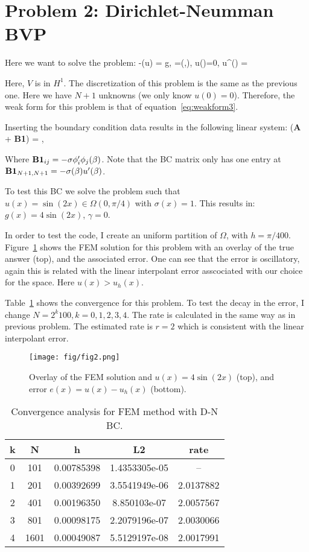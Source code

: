 \documentclass[10pt]{article}
\def\up#1{ #1^{\prime}}
\begin{document}
\section{Problem 2: Dirichlet-Neumman BVP}
Here we want to solve the problem:
\beq
-\nabla\cdot(\sigma\nabla u) = g, \Omega=(\alpha,\beta), u(\alpha)=0, \up{u}(\beta) =\gamma
\label{eq:D-N}
\eeq

Here, $V$ is in $H^1$. The discretization of this problem is the same as the previous one. 
Here we have $N+1$ unknowns (we only know $u(0)=0$). Therefore, the weak form for this problem is that
of equation~\ref{eq:weakform3}.

Inserting the boundary condition data results in the following linear system:
\beq
 \left({\bf A} + {\bf B1}\right)\vec{\alpha} = ,
\label{eq:sdn}
\eeq

Where ${\bf B1}_{ij} = -\sigma\up{\phi}_i\phi_j (\beta)$. Note that 
the BC matrix only has one entry at ${\bf B1}_{N+1,N+1} = -\sigma(\beta)\up{u}(\beta)$. 

To test this BC we solve the problem such that $u(x) = \sin(2x) \in \Omega(0,\pi/4)$ with $\sigma(x) =1$. This results in:
$g(x) = 4\sin(2x)$, $\gamma = 0$.

In order to test the code, I create an uniform partition of $\Omega$, with $h = \pi/400$.
Figure~\ref{fig:fig2} shows the FEM solution for this problem with an overlay of the true answer (top), and the
associated error. One can see that the error is oscillatory, again this is related with the linear interpolant error
asscociated with our choice for the space. Here $u(x) > u_h(x)$.

Table~\ref{tab:table2} shows the convergence for this problem. To test the decay in the error, I 
change $N = 2^k100, k=0,1,2,3,4$. The rate is calculated in the same way as in previous problem. The 
estimated rate is $r=2$ which is consistent with the linear interpolant error.

\begin{figure}
\centering

\texttt{[image: fig/fig2.png]}
\caption{Overlay of the FEM solution and $u(x)= 4\sin(2x)$ (top), and error $e(x) = u(x)-u_h(x)$ (bottom).}
\label{fig:fig2}
\end{figure}

\begin{table}
\centering
  \begin{tabular}{c | c | c | c | c}
k&   N &      h    &     L2    &     rate      \\ \hline
0&  101& 0.00785398& 1.4353305e-05&  --        \\
1&  201& 0.00392699& 3.5541949e-06&  2.0137882 \\
2&  401& 0.00196350& 8.850103e-07&  2.0057567  \\
3&  801& 0.00098175& 2.2079196e-07&  2.0030066 \\ 
4& 1601& 0.00049087& 5.5129197e-08&  2.0017991
  \end{tabular}
\caption{Convergence analysis for FEM method with D-N BC.}
\label{tab:table2}
\end{table}
\end{document}
